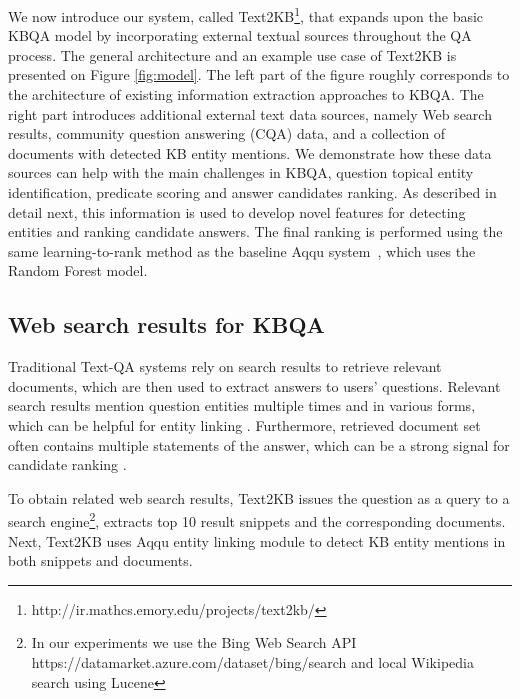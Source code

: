 We now introduce our system, called Text2KB\footnote{http://ir.mathcs.emory.edu/projects/text2kb/}, that expands upon the basic KBQA model by incorporating external textual sources throughout the QA process. The general architecture and an example use case of Text2KB is presented on Figure \ref{fig:model}. 
The left part of the figure roughly corresponds to the architecture of existing information extraction approaches to KBQA.
The right part introduces additional external text data sources, namely Web search results, community question answering (CQA) data, and a collection of documents with detected KB entity mentions.
We demonstrate how these data sources can help with the main challenges in KBQA, \ie question topical entity identification, predicate scoring and answer candidates ranking.
As described in detail next, this information is used to develop novel features for detecting entities and ranking candidate answers. The final ranking is performed using the same learning-to-rank method as the baseline Aqqu system~\cite{ACCU:2015}, which uses the Random Forest model.



\subsection{Web search results for KBQA}
\label{section:method:web}

Traditional Text-QA systems rely on search results to retrieve relevant documents, which are then used to extract answers to users' questions.
Relevant search results mention question entities multiple times and in various forms, which can be helpful for entity linking \cite{SMAPH_ERD:2014}.
Furthermore, retrieved document set often contains multiple statements of the answer, which can be a strong signal for candidate ranking \cite{Lin:2007:EPU:1229179.1229180}.

To obtain related web search results, Text2KB issues the question as a query to a search engine\footnote{In our experiments we use the Bing Web Search API https://datamarket.azure.com/dataset/bing/search and local Wikipedia search using Lucene}, extracts top 10 result snippets and the corresponding documents.
Next, Text2KB uses Aqqu entity linking module to detect KB entity mentions in both snippets and documents.

